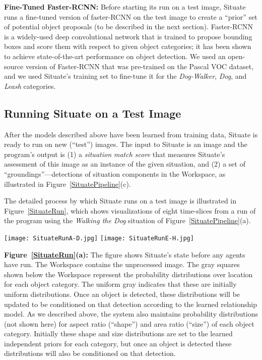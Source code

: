 \documentclass[conference]{IEEEtran}
\begin{document}
{\bf Fine-Tuned Faster-RCNN:} Before starting its run on a test image,
Situate runs a fine-tuned version of faster-RCNN on the test image to
create a ``prior'' set of potential object proposals (to be described
in the next section).  Faster-RCNN \cite{Ren2015} is a widely-used
deep convolutional network that is trained to propose bounding boxes
and score them with respect to given object categories; it has been
shown to achieve state-of-the-art performance on object detection.  We
used an open-source version of Faster-RCNN \cite{Girshick2015a} that
was pre-trained on the Pascal VOC dataset, and we used Situate's
training set to fine-tune it for the {\it Dog-Walker}, {\it Dog}, and
{\it Leash} categories. 

\subsection{Running Situate on a Test Image}

After the models described above have been learned from training data,
Situate is ready to run on new (``test'') images.  The input to
Situate is an image and the program's output is (1) a {\it situation
  match score} that measures Situate's assessment of this image as an
instance of the given situation, and (2) a set of
``groundings''---detections of situation components in the Workspace,
as illustrated in Figure~\ref{SituatePipeline}(c).

The detailed process by which Situate runs on a test image is
illustrated in Figure~\ref{SituateRun}, which shows visualizations of
eight time-slices from a run of the program using the {\it Walking the
  Dog} situation of Figure~\ref{SituatePipeline}(a).

\begin{figure*}[t]
\centering
\texttt{[image: SituateRunA-D.jpg]}
\vspace*{.05in}
\texttt{[image: SituateRunE-H.jpg]}
\caption{(Best viewed in color.) Visualization of eight time steps in a run of Situate.  See text for explanation. }
\label{SituateRun}
\end{figure*}

{\bf Figure~\ref{SituateRun}(a):} The figure shows Situate's state before any
agents have run.  The Workspace contains the unprocessed image.
The gray squares shown below the Workspace represent the probability
distributions over location for each object category.  The uniform
gray indicates that these are initially uniform distributions.  Once
an object is detected, these distributions will be updated to be
conditioned on that detection according to the learned relationship model.
As we described above, the system also maintains
probability distributions (not shown here) for aspect ratio
(``shape'') and area ratio (``size'') of each object category.
Initially these shape and size distributions are set to the learned
independent priors for each category, but once an object is detected
these distributions will also be conditioned on that detection.
\end{document}
